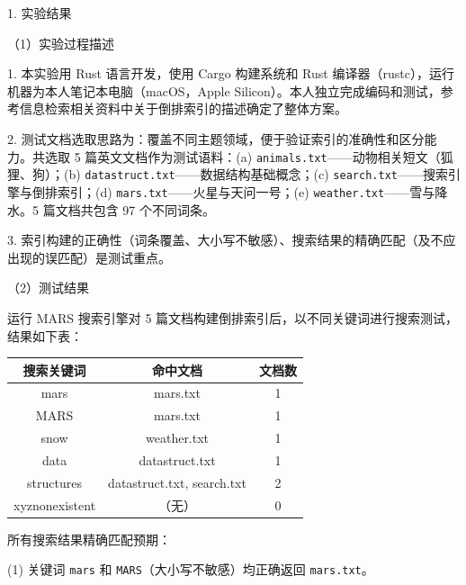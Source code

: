\noindent\hspace*{2em}1. 实验结果\par
\noindent\hspace*{2em}（1）实验过程描述\par
\noindent\hspace*{2em}1. 本实验用 Rust 语言开发，使用 Cargo 构建系统和 Rust 编译器（rustc），运行机器为本人笔记本电脑（macOS，Apple Silicon）。本人独立完成编码和测试，参考信息检索相关资料中关于倒排索引的描述确定了整体方案。\par
\noindent\hspace*{2em}2. 测试文档选取思路为：覆盖不同主题领域，便于验证索引的准确性和区分能力。共选取 5 篇英文文档作为测试语料：(a) \texttt{animals.txt}——动物相关短文（狐狸、狗）；(b) \texttt{datastruct.txt}——数据结构基础概念；(c) \texttt{search.txt}——搜索引擎与倒排索引；(d) \texttt{mars.txt}——火星与天问一号；(e) \texttt{weather.txt}——雪与降水。5 篇文档共包含 97 个不同词条。\par
\noindent\hspace*{2em}3. 索引构建的正确性（词条覆盖、大小写不敏感）、搜索结果的精确匹配（及不应出现的误匹配）是测试重点。\par
\noindent\hspace*{2em}（2）测试结果\par
\noindent\hspace*{2em}运行 MARS 搜索引擎对 5 篇文档构建倒排索引后，以不同关键词进行搜索测试，结果如下表：\par
\begin{center}
\fontsize{9pt}{12pt}\selectfont
\renewcommand{\arraystretch}{1.3}
\begin{tabular}{|c|c|c|}
\hline
\textbf{搜索关键词} & \textbf{命中文档} & \textbf{文档数} \\ \hline
mars & mars.txt & 1 \\ \hline
MARS & mars.txt & 1 \\ \hline
snow & weather.txt & 1 \\ \hline
data & datastruct.txt & 1 \\ \hline
structures & datastruct.txt, search.txt & 2 \\ \hline
xyznonexistent & （无） & 0 \\ \hline
\end{tabular}
\end{center}
\noindent\hspace*{2em}所有搜索结果精确匹配预期：\par
\noindent\hspace*{2em}(1) 关键词 \texttt{mars} 和 \texttt{MARS}（大小写不敏感）均正确返回 \texttt{mars.txt}。\par
